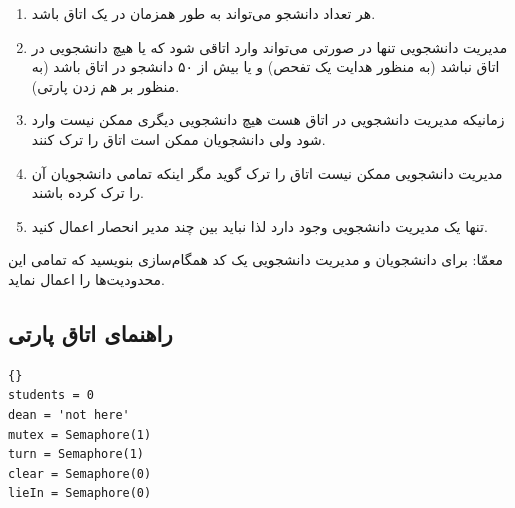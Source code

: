 \documentclass{book}
\newcommand{\clearemptydoublepage}{\newpage\cleardoublepage}
\begin{document}
\begin{enumerate}

\item %
    هر تعداد دانشجو می‌تواند به طور همزمان در یک اتاق باشد.

\item 
    مدیریت دانشجویی تنها  در صورتی می‌تواند وارد اتاقی شود که یا هیچ دانشجویی در اتاق نباشد (به منظور هدایت یک تفحص) و 
    یا بیش از ۵۰ دانشجو در اتاق باشد  (به منظور بر هم زدن پارتی).

\item 
    زمانیکه مدیریت دانشجویی در اتاق هست هیچ دانشجویی دیگری ممکن نیست وارد شود ولی دانشجویان ممکن است اتاق را ترک کنند. 

\item 
    مدیریت دانشجویی ممکن نیست اتاق را ترک گوید مگر اینکه تمامی دانشجویان آن را ترک کرده باشند. 

\item 
    تنها یک مدیریت دانشجویی وجود دارد لذا نباید بین چند مدیر انحصار اعمال کنید. 

\end{enumerate}

    معمّا: برای دانشجویان و مدیریت دانشجویی یک کد همگام‌سازی بنویسید که تمامی این محدودیت‌ها را اعمال نماید. 


\clearemptydoublepage
\subsection{راهنمای اتاق پارتی}

\begin{latin}
\begin{lstlisting}[title=\rl{راهنمای اتاق پارتی}]{}
students = 0                
dean = 'not here'           
mutex = Semaphore(1)
turn = Semaphore(1)
clear = Semaphore(0)
lieIn = Semaphore(0)
\end{lstlisting}
\end{latin}
\end{document}
